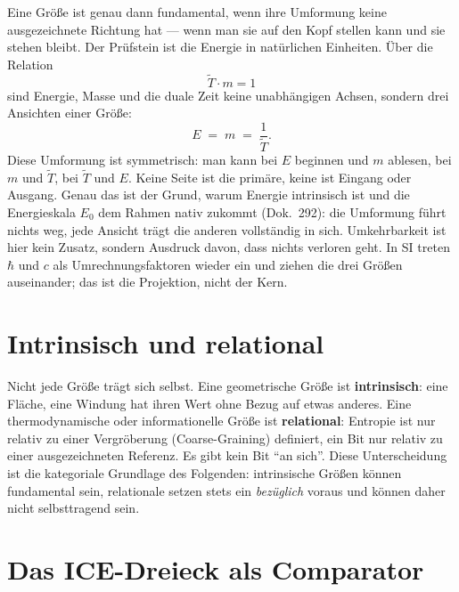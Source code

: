 Eine Größe ist genau dann fundamental, wenn ihre Umformung keine
ausgezeichnete Richtung hat --- wenn man sie auf den Kopf stellen kann und sie
stehen bleibt. Der Prüfstein ist die Energie in natürlichen Einheiten. Über
die Relation
\begin{equation}
  \tilde{T}\cdot m = 1
\end{equation}
sind Energie, Masse und die duale Zeit keine unabhängigen Achsen, sondern drei
Ansichten einer Größe:
\begin{equation}
  E \;=\; m \;=\; \frac{1}{\tilde{T}}.
\end{equation}
Diese Umformung ist symmetrisch: man kann bei $E$ beginnen und $m$ ablesen,
bei $m$ und $\tilde{T}$, bei $\tilde{T}$ und $E$. Keine Seite ist die primäre,
keine ist Eingang oder Ausgang. Genau das ist der Grund, warum Energie
intrinsisch ist und die Energieskala $E_0$ dem Rahmen nativ zukommt (Dok.~292):
die Umformung führt nichts weg, jede Ansicht trägt die anderen vollständig in
sich. Umkehrbarkeit ist hier kein Zusatz, sondern Ausdruck davon, dass nichts
verloren geht. In SI treten $\hbar$ und $c$ als Umrechnungsfaktoren wieder ein
und ziehen die drei Größen auseinander; das ist die Projektion, nicht der Kern.

\section{Intrinsisch und relational}

Nicht jede Größe trägt sich selbst. Eine geometrische Größe ist
\textbf{intrinsisch}: eine Fläche, eine Windung hat ihren Wert ohne Bezug auf
etwas anderes. Eine thermodynamische oder informationelle Größe ist
\textbf{relational}: Entropie ist nur relativ zu einer Vergröberung
(Coarse-Graining) definiert, ein Bit nur relativ zu einer ausgezeichneten
Referenz. Es gibt kein Bit \enquote{an sich}. Diese Unterscheidung ist die
kategoriale Grundlage des Folgenden: intrinsische Größen können fundamental
sein, relationale setzen stets ein \emph{bezüglich} voraus und können daher
nicht selbsttragend sein.

\section{Das ICE-Dreieck als Comparator}

